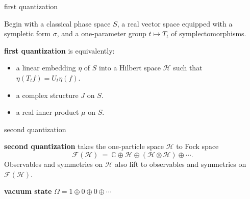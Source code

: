 \documentclass[8pt]{beamer}
\author{Hans Halvorson}
\date[November 2013]{November 12, 2013} \usetheme{Copenhagen}
\begin{document}
\def\2{\mathcal}
\def\7{\mathbb}
\newenvironment{proenv}{\only{\setbeamercolor{local structure}{fg=green}}}{}
\newenvironment{conenv}{\only{\setbeamercolor{local structure}{fg=red}}}{}  
\newenvironment{neuenv}{\only{\setbeamercolor{local
      structure}{fg=yellow}}}{}


\newcommand{\3}{\mathfrak}

\begin{frame}[plain]
  \titlepage
\end{frame}

\begin{frame}{first quantization}

  Begin with a classical phase space $S$, a real vector space equipped
  with a sympletic form $\sigma$, and a one-parameter group $t\mapsto
  T_t$ of symplectomorphisms.
  
  \bigskip \textbf{first quantization} is equivalently:

\begin{itemize}
\item a linear embedding $\eta$ of $S$ into a Hilbert space $\2H$ such
  that $\eta (T_{t}f) = U_{t}\eta (f)$.
\item a complex structure $J$ on $S$.
\item a real inner product $\mu$ on $S$.
\end{itemize}


\end{frame}
\begin{frame}{second quantization}

  \bigskip \textbf{second quantization} takes the one-particle space
  $\2H$ to Fock space
$$ \2F (\2H ) \: = \: \7C\oplus \2H\oplus (\2H\otimes \2H)\oplus \cdots .$$
Observables and symmetries on $\2H$ also lift to observables and
symmetries on $\2F (\2H )$.

\bigskip \textbf{vacuum state} $\Omega = 1\oplus 0\oplus 0\oplus
\cdots $

\end{frame}
\end{document}
